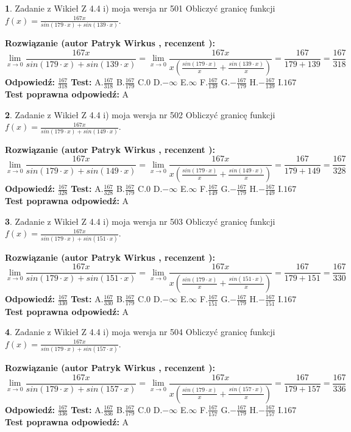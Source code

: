 \documentclass[12pt, a4paper]{article}
\theoremstyle{definition} %
\newtheorem{zad}{}
\newcommand{\zadStart}[1]{\begin{zad}#1\newline}
\newcommand{\zadStop}{\end{zad}}
\newcommand{\rozwStart}[2]{\noindent \textbf{Rozwiązanie (autor #1 , recenzent #2): }\newline}
\newcommand{\rozwStop}{\newline}
\newcommand{\odpStart}{\noindent \textbf{Odpowiedź:}\newline}
\newcommand{\odpStop}{\newline}
\newcommand{\testStart}{\noindent \textbf{Test:}\newline}
\newcommand{\testStop}{\newline}
\newcommand{\kluczStart}{\noindent \textbf{Test poprawna odpowiedź:}\newline}
\newcommand{\kluczStop}{\newline}
\begin{document}
\zadStart{Zadanie z Wikieł Z 4.4 i) moja wersja nr 501}
Obliczyć granicę funkcji $f(x)=\frac{167x}{sin(179\cdot x) +sin(139\cdot x)}$.
\zadStop
\rozwStart{Patryk Wirkus}{}
$$\lim\limits_{x\to 0}\frac{167x}{sin(179\cdot x) +sin(139\cdot x)}=\lim\limits_{x\to 0}\frac{167x}{x(\frac{sin(179\cdot x)}{x}+\frac{sin(139\cdot x)}{x})}=\frac{167}{179+139} = \frac{167}{318}$$
\rozwStop
\odpStart
$\frac{167}{318}$
\odpStop
\testStart
A.$\frac{167}{318}$
B.$\frac{167}{179}$
C.$0$
D.$-\infty$
E.$\infty$
F.$\frac{167}{139}$
G.$-\frac{167}{179}$
H.$-\frac{167}{139}$
I.$167$
\testStop
\kluczStart
A
\kluczStop



\zadStart{Zadanie z Wikieł Z 4.4 i) moja wersja nr 502}
Obliczyć granicę funkcji $f(x)=\frac{167x}{sin(179\cdot x) +sin(149\cdot x)}$.
\zadStop
\rozwStart{Patryk Wirkus}{}
$$\lim\limits_{x\to 0}\frac{167x}{sin(179\cdot x) +sin(149\cdot x)}=\lim\limits_{x\to 0}\frac{167x}{x(\frac{sin(179\cdot x)}{x}+\frac{sin(149\cdot x)}{x})}=\frac{167}{179+149} = \frac{167}{328}$$
\rozwStop
\odpStart
$\frac{167}{328}$
\odpStop
\testStart
A.$\frac{167}{328}$
B.$\frac{167}{179}$
C.$0$
D.$-\infty$
E.$\infty$
F.$\frac{167}{149}$
G.$-\frac{167}{179}$
H.$-\frac{167}{149}$
I.$167$
\testStop
\kluczStart
A
\kluczStop



\zadStart{Zadanie z Wikieł Z 4.4 i) moja wersja nr 503}
Obliczyć granicę funkcji $f(x)=\frac{167x}{sin(179\cdot x) +sin(151\cdot x)}$.
\zadStop
\rozwStart{Patryk Wirkus}{}
$$\lim\limits_{x\to 0}\frac{167x}{sin(179\cdot x) +sin(151\cdot x)}=\lim\limits_{x\to 0}\frac{167x}{x(\frac{sin(179\cdot x)}{x}+\frac{sin(151\cdot x)}{x})}=\frac{167}{179+151} = \frac{167}{330}$$
\rozwStop
\odpStart
$\frac{167}{330}$
\odpStop
\testStart
A.$\frac{167}{330}$
B.$\frac{167}{179}$
C.$0$
D.$-\infty$
E.$\infty$
F.$\frac{167}{151}$
G.$-\frac{167}{179}$
H.$-\frac{167}{151}$
I.$167$
\testStop
\kluczStart
A
\kluczStop



\zadStart{Zadanie z Wikieł Z 4.4 i) moja wersja nr 504}
Obliczyć granicę funkcji $f(x)=\frac{167x}{sin(179\cdot x) +sin(157\cdot x)}$.
\zadStop
\rozwStart{Patryk Wirkus}{}
$$\lim\limits_{x\to 0}\frac{167x}{sin(179\cdot x) +sin(157\cdot x)}=\lim\limits_{x\to 0}\frac{167x}{x(\frac{sin(179\cdot x)}{x}+\frac{sin(157\cdot x)}{x})}=\frac{167}{179+157} = \frac{167}{336}$$
\rozwStop
\odpStart
$\frac{167}{336}$
\odpStop
\testStart
A.$\frac{167}{336}$
B.$\frac{167}{179}$
C.$0$
D.$-\infty$
E.$\infty$
F.$\frac{167}{157}$
G.$-\frac{167}{179}$
H.$-\frac{167}{157}$
I.$167$
\testStop
\kluczStart
A
\kluczStop
\end{document}
